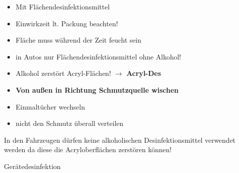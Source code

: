 \documentclass{article}
\newcommand\gEs[1]{\textbf{\textcolor[rgb]{0.0,0.0,0.5019608}{#1}}}
\newcommand\gEs[1]{\textbf{\textcolor[rgb]{0.0,0.0,0.5019608}{#1}}}
\newcommand\gT[1]{\textbf{\textup{\textcolor[rgb]{0.0,0.5019608,0.0}{#1}}}}
\begin{document}
\begin{itemize}
\item {\mdseries
Mit Fl\"achendesinfektionsmittel }

\item {\mdseries
Einwirkzeit lt. Packung beachten!}

\item {\mdseries
Fl\"ache muss w\"ahrend der Zeit feucht sein}

\item {\mdseries
in Autos nur Fl\"achendesinfektionsmittel ohne Alkohol!}

\end{itemize}
\begin{itemize}
\item {\mdseries
Alkohol zerst\"ort Acryl-Fl\"achen! ${\rightarrow}$
\gT{Acryl-Des{\texttrademark}}
 }

\end{itemize}
\begin{itemize}
\item {\mdseries
\gEs{Von au{\ss}en in Richtung Schmutzquelle
wischen}}

\item {\mdseries
Einmalt\"ucher wechseln}

\end{itemize}
\begin{itemize}
\item {\mdseries
nicht den Schmutz \"uberall verteilen}

\end{itemize}
{\mdseries\color{black}
In den Fahrzeugen d\"urfen keine alkoholischen Desinfektionsmittel
verwendet werden da diese die Acryloberfl\"achen zerst\"oren k\"onnen!}

{\mdseries\color[rgb]{0.0,0.0,0.5019608}
Ger\"atedesinfektion}
\end{document}
